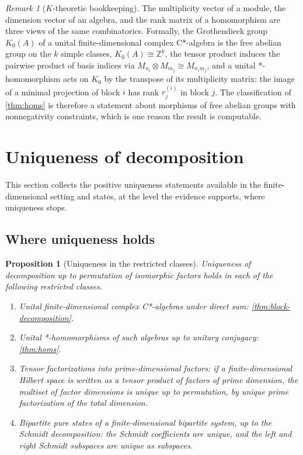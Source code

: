 \documentclass[11pt,letterpaper]{article}
\newtheorem{proposition}[theorem]{Proposition}
\theoremstyle{definition}
\theoremstyle{remark}
\newtheorem{remark}[theorem]{Remark}
\begin{document}
\begin{remark}[$K$-theoretic bookkeeping]
\label{rem:k-theory}
The multiplicity vector of a module, the dimension vector of an algebra, and the rank matrix of a homomorphism are three views of the same combinatorics. Formally, the Grothendieck group $K_0(A)$ of a unital finite-dimensional complex C*-algebra is the free abelian group on the $k$ simple classes, $K_0(A) \cong \mathbb{Z}^k$, the tensor product induces the pairwise product of basis indices via $M_{n_i} \otimes M_{m_j} \cong M_{n_i m_j}$, and a unital *-homomorphism acts on $K_0$ by the transpose of its multiplicity matrix: the image of a minimal projection of block $i$ has rank $r^{(i)}_j$ in block $j$. The classification of \cref{thm:homs} is therefore a statement about morphisms of free abelian groups with nonnegativity constraints, which is one reason the result is computable.
\end{remark}

\section{Uniqueness of decomposition}

This section collects the positive uniqueness statements available in the finite-dimensional setting and states, at the level the evidence supports, where uniqueness stops.

\subsection{Where uniqueness holds}

\begin{proposition}[Uniqueness in the restricted classes]
\label{prop:unique-restricted}
Uniqueness of decomposition up to permutation of isomorphic factors holds in each of the following restricted classes.
\begin{enumerate}
\item Unital finite-dimensional complex C*-algebras under direct sum: \cref{thm:block-decomposition}.
\item Unital *-homomorphisms of such algebras up to unitary conjugacy: \cref{thm:homs}.
\item Tensor factorizations into prime-dimensional factors: if a finite-dimensional Hilbert space is written as a tensor product of factors of prime dimension, the multiset of factor dimensions is unique up to permutation, by unique prime factorization of the total dimension.
\item Bipartite pure states of a finite-dimensional bipartite system, up to the Schmidt decomposition: the Schmidt coefficients are unique, and the left and right Schmidt subspaces are unique as subspaces.
\end{enumerate}
\end{proposition}
\end{document}
